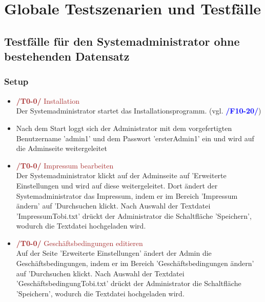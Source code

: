 \documentclass[a4paper]{scrreprt}
\newcounter{Lc}
\newcounter{Hc}
\newcommand{\resetAllCounter}{\setcounter{Lc}{0}\setcounter{Hc}{1}}
\begin{document}
\resetAllCounter
\newcommand{\Test}[1]{\stepcounter{Lc}\textcolor{Brown}{\textbf{/T\arabic{Hc}0-\arabic{Lc}0/} #1} \\}
\newcommand{\RefFuncBlue}[1]{\textcolor{Blue}{\textbf{#1}}}
\newcommand{\RefFuncGreen}[1]{\textcolor{Green}{\textbf{#1}}}
\chapter{Globale Testszenarien und Testfälle}
 

	\section{Testfälle für den Systemadministrator ohne bestehenden Datensatz}
		\subsection{Setup}
			\begin{itemize}
				\item \Test{Installation} 
				Der Systemadministrator startet das Installationsprogramm. (vgl. \RefFuncBlue{/F10-20/})
						
				\item Nach dem Start loggt sich der Administrator mit dem vorgefertigten Benutzername 'admin1' und dem Passwort 'ersterAdmin1' ein und wird auf die Adminseite weitergeleitet
				 
				 \item \Test{Impressum bearbeiten}
				 Der Systemadministrator klickt auf der Adminseite auf 'Erweiterte Einstellungen und wird auf diese weitergeleitet. Dort ändert der Systemadministrator das Impressum, indem er im Bereich 'Impressum ändern' auf 'Durchsuchen klickt. Nach Auswahl der Textdatei 'ImpressumTobi.txt' drückt der Administrator die Schaltfläche 'Speichern', wodurch die Textdatei hochgeladen wird.
				 
				 \item \Test{Geschäftsbedingungen editieren}
				 Auf der Seite 'Erweiterte Einstellungen' ändert der Admin die Geschäftsbedingungen, indem er im Bereich 'Geschäftsbedingungen ändern' auf 'Durchsuchen klickt. Nach Auswahl der Textdatei 'GeschäftsbedingungTobi.txt' drückt der Administrator die Schaltfläche 'Speichern', wodurch die Textdatei hochgeladen wird.	 
			\end{itemize}		
				
\end{document}
